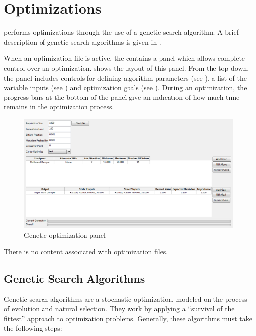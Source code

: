 \chapter{Optimizations} \label{ch:optimizations}

\vvase{} performs optimizations through the use of a genetic search algorithm.  A brief description of genetic search algorithms is given in .

When an optimization file is active, the  contains a panel which allows complete control over an optimization.   shows the layout of this panel.  From the top down, the panel includes controls for defining algorithm parameters (see ), a list of the variable inputs (see ) and optimization goals (see ).  During an optimization, the progress bars at the bottom of the panel give an indication of how much time remains in the optimization process.

\begin{figure}
  \includegraphics[width=\textwidth]{images/gaPanel}
  \caption{Genetic optimization panel} \label{fig:gaPanel}
  \centering
\end{figure}

There is no  content associated with optimization files.

\section{Genetic Search Algorithms} \label{sec:geneticAlgorithms}

Genetic search algorithms are a stochastic optimization, modeled on the process of evolution and natural selection.  They work by applying a ``survival of the fittest'' approach to optimization problems.  Generally, these algorithms must take the following steps:

